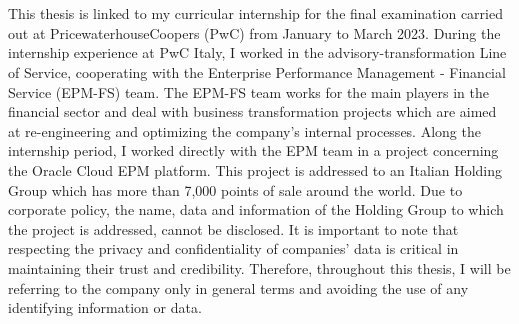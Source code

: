 \documentclass[12pt,a4paper,openright,twoside]{book}
\begin{document}


\tableofcontents   
\lstlistoflistings %

\mainmatter

\chapter{\introductionname}
\label{chap:introduction}

This thesis is linked to my curricular internship for the final examination carried out at PricewaterhouseCoopers (PwC) from January to March 2023.
%
During the internship experience at PwC Italy, I worked in the advisory-transformation Line of Service, cooperating with the Enterprise Performance Management - Financial Service (EPM-FS) team.
%
The EPM-FS team works for the main players in the financial sector and deal with business transformation projects which are aimed at re-engineering and optimizing the company's internal processes.
%
Along the internship period, I worked directly with the EPM team in a project concerning the Oracle Cloud EPM platform.
%
This project is addressed to an Italian Holding Group which has more than 7,000 points of sale around the world. 
%
Due to corporate policy, the name, data and information of the Holding Group to which the project is addressed, cannot be disclosed. 
%
It is important to note that respecting the privacy and confidentiality of companies' data is critical in maintaining their trust and credibility.
%
Therefore, throughout this thesis, I will be referring to the company only in general terms and avoiding the use of any identifying information or data. \\
\end{document}
